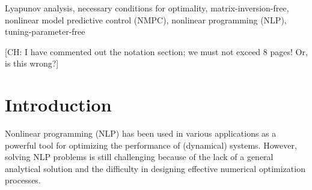 \documentclass[journal]{IEEEtranTIE}
\newcommand{\CHHA}[1]{{\color{red} [CH: #1]}} %
\begin{document}
\begin{IEEEkeywords}
Lyapunov analysis, necessary conditions for optimality, matrix-inversion-free, nonlinear model predictive control (NMPC), nonlinear programming (NLP), tuning-parameter-free
\end{IEEEkeywords}

{}




\CHHA{I have commented out the notation section; we must not exceed 8 pages! Or, is this wrong?}

\section{Introduction}


Nonlinear programming (NLP) has been used in various applications as a powerful tool for optimizing the performance of (dynamical) systems\cite{betts2010practical,andersson2019casadi}. However, solving NLP problems is still challenging because of the lack of a general analytical solution and the difficulty in designing effective numerical optimization processes\cite{karamanakos2020model}. 
\end{document}
